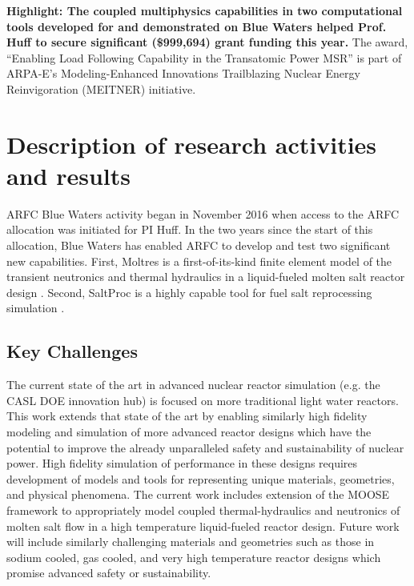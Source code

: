 \documentclass[letterpaper]{article}
\begin{document}
\textbf{Highlight: The coupled multiphysics capabilities in two computational tools 
        developed for and demonstrated on Blue Waters helped Prof. Huff to secure 
significant (\$999,694) grant funding this year.} The award, ``Enabling Load 
Following Capability in the Transatomic Power MSR'' is part of ARPA-E's 
Modeling-Enhanced Innovations Trailblazing Nuclear Energy Reinvigoration 
(MEITNER) initiative. 

\section{Description of research activities and results}

ARFC Blue Waters activity began in November 2016 when access to the ARFC 
allocation was initiated for PI Huff. In the two years since the start of 
this allocation, Blue Waters has enabled ARFC to develop and test two 
significant new capabilities. First, Moltres is a first-of-its-kind finite 
element model of the transient neutronics and thermal hydraulics in a 
liquid-fueled molten salt reactor design 
\cite{lindsay_introduction_2018,lindsay_moltres:_2018,ridley_introduction_2017,ridley_multiphysics_2017}.
Second, SaltProc is a highly capable tool for fuel salt reprocessing 
simulation 
\cite{rykhlevskii_full-core_2017,rykhlevskii_arfc/saltproc:_2018,rykhlevskii_advanced_2018}.


\subsection{Key Challenges}
The current state of the art in advanced nuclear reactor simulation (e.g. the
CASL DOE innovation hub) is focused on more traditional light water reactors.
This work extends that state of the art by enabling similarly high fidelity
modeling and simulation of more advanced reactor designs which have the
potential to improve the already unparalleled safety and sustainability of
nuclear power. High fidelity simulation of performance in these designs
requires development of models and tools for representing unique materials,
geometries, and physical phenomena.  The current work includes extension of the
MOOSE framework to appropriately model coupled thermal-hydraulics and
neutronics of molten salt flow in a high temperature liquid-fueled reactor
design. Future work will include similarly challenging materials and geometries
such as those in sodium cooled, gas cooled, and very high temperature reactor
designs which promise advanced safety or sustainability.
\end{document}

